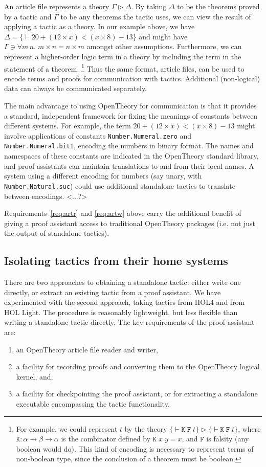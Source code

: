 \documentclass{llncs}
\newcommand{\OpenTheory}{OpenTheory\xspace}
\newcommand{\ie}{i.e.\xspace}
\begin{document}
An article file represents a theory $\Gamma\rhd\Delta$.
By taking $\Delta$ to be the theorems proved by a tactic and $\Gamma$ to be any theorems the tactic uses, we can view the result of applying a tactic as a theory.
In our example above, we have $\Delta=\{\vdash20+(12\times x)<(x\times 8)-13\}$ and might have $\Gamma\ni\forall{m\,n}.\;m\times n = n\times m$ amongst other assumptions.
Furthermore, we can represent a higher-order logic term in a theory by including the term in the statement of a theorem. \footnote{For example, we could represent $t$ by the theory $\{\vdash\mathtt{K\;F\;}t\}\rhd\{\vdash\mathtt{K\;F\;}t\}$, where $\mathtt{K}:\alpha\to\beta\to\alpha$ is the combinator defined by $\mathtt{K}\;x\;y=x$, and $\mathtt{F}$ is falsity (any boolean would do).
This kind of encoding is necessary to represent terms of non-boolean type, since the conclusion of a theorem must be boolean.}
Thus the same format, article files, can be used to encode terms and proofs for communication with tactics.
Additional (non-logical) data can always be communicated separately.

The main advantage to using \OpenTheory for communication is that it provides a standard, independent framework for fixing the meanings of constants between different systems.
For example, the term $20+(12\times x)<(x\times 8)-13$ might involve applications of constants \texttt{Number.Numeral.zero} and \texttt{Number.Numeral.bit1}, encoding the numbers in binary format.
The names and namespaces of these constants are indicated in the \OpenTheory standard library, and proof assistants can maintain translations to and from their local names.
A system using a different encoding for numbers (say unary, with \texttt{Number.Natural.suc}) could use additional standalone tactics to translate between encodings.
<...?>

Requirements~\ref{req:artr} and \ref{req:artw} above carry the additional benefit of giving a proof assistant access to traditional \OpenTheory packages (\ie not just the output of standalone tactics).

\subsection{Isolating tactics from their home systems}
There are two approaches to obtaining a standalone tactic: either write one directly, or extract an existing tactic from a proof assistant. 
We have experimented with the second approach, taking tactics from HOL4 and from HOL Light.
The procedure is reasonably lightweight, but less flexible than writing a standalone tactic directly.
The key requirements of the proof assistant are:
\begin{enumerate}
\item
\label{req:io} an \OpenTheory article file reader and writer,
\item
\label{req:log} a facility for recording proofs and converting them to the \OpenTheory logical kernel, and,
\item
\label{req:ckpt} a facility for checkpointing the proof assistant, or for extracting a standalone executable encompassing the tactic functionality.
\end{enumerate}
\end{document}
